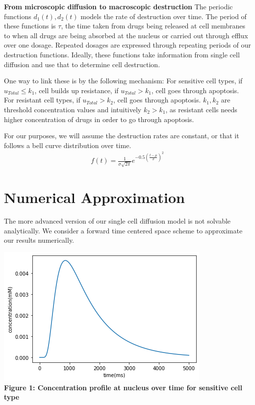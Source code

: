 \documentclass{edm_article}
\begin{document}
\textbf{From microscopic diffusion to macroscopic destruction} The periodic functions $d_1(t), d_2(t)$ models the rate of destruction over time. The period of these functions is $\tau$, the time taken from drugs being released at cell membranes to when all drugs are being absorbed at the nucleus or carried out through efflux over one dosage. Repeated dosages are expressed through repeating periods of our destruction functions. Ideally, these functions take information from single cell diffusion and use that to determine cell destruction. 

One way to link these is by the following mechanism: For sensitive cell types, if $u_{Total} \leq k_1$, cell builds up resistance, if $u_{Total} > k_1$, cell goes through apoptosis. For resistant cell types, if $u_{Total} > k_2$, cell goes through apoptosis. $k_1, k_2$ are threshold concentration values and intuitively $k_2 > k_1$, as resistant cells needs higher concentration of drugs in order to go through apoptosis. 

For our purposes, we will assume the destruction rates are constant, or that it follows a bell curve distribution over time. 
\begin{align*}
    f(t) = \frac{1}{\sigma\sqrt{2\pi}}e^{-0.5(\frac{t-\mu}{\sigma})^2}
\end{align*}

\section{Numerical Approximation}
The more advanced version of our single cell diffusion model is not solvable analytically. We consider a forward time centered space scheme to approximate our results numerically. 

\includegraphics[scale = 0.6]{sensitive.png}\\
\textbf{Figure 1: Concentration profile at nucleus over time for sensitive cell type}
\end{document}
